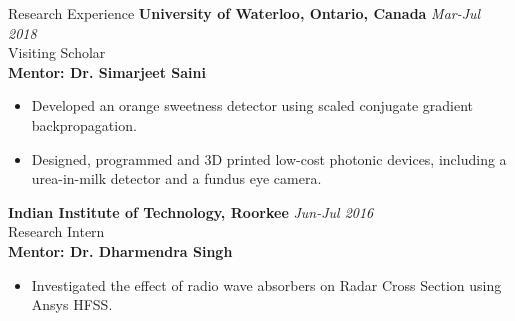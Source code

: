\documentclass{resume} %
\begin{document}
\begin{rSection}{Research Experience}
    \textbf{University of Waterloo, Ontario, Canada} \hfill \textit{Mar-Jul 2018}
    \\ Visiting Scholar
    \\ \textbf{Mentor: Dr. Simarjeet Saini}
    \vspace{-0.2cm}
    \begin{itemize}[noitemsep,nolistsep]
        \item Developed an orange sweetness detector using scaled conjugate gradient backpropagation.
        \item Designed, programmed and 3D printed low-cost photonic devices, including a urea-in-milk detector and a fundus eye camera.
    \end{itemize}
    
    \textbf{Indian Institute of Technology, Roorkee} \hfill \textit{Jun-Jul 2016}
    \\ Research Intern
    \\ \textbf{Mentor: Dr. Dharmendra Singh}
    \vspace{-0.2cm}
    \begin{itemize}[noitemsep,nolistsep]
        \item Investigated the effect of radio wave absorbers on Radar Cross Section using Ansys HFSS.
    \end{itemize}
\end{rSection}
\end{document}

